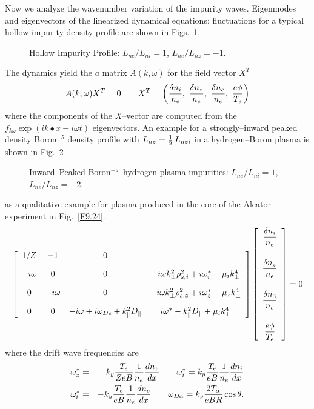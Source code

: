 \documentclass[a4paper,openany,12pt]{book}
\begin{document}
Now we analyze the wavenumber variation of the impurity waves. Eigenmodes and eigenvectors of the linearized dynamical equations:  fluctuations for a typical hollow impurity density profile are shown in Figs.~\ref{F9.29}.
%
\begin{figure}[H]
\centerline{}
\caption{Hollow Impurity Profile: $L_{ne}/L_{ni}= 1$, $L_{ne}/L_{nz}= -1$.}
\label{F9.29}
\end{figure}
%
The dynamics yield the $a$ matrix $A(k,\omega)$ for the field vector $X^T$
$$A(k,\omega)X^T=0\qquad X^T=\left({\delta n_i\over n_e},\ {\delta n_z\over n_e},\ {\delta n_e\over n_e},\ {e\phi\over T_e}\right)$$
where the components of the $X$--vector are computed from the $f_{k\omega}\exp(ik\bullet x-i\omega t)$ eigenvectors. An example for a strongly--inward peaked density Boron$^{+5}$ density profile with $L_{nz}={1\over 2}\, L_{nzi}$ in a hydrogen--Boron plasma is shown in Fig.~\ref{F9.30}
%
\begin{figure}[H]
\centerline{}
\centerline{}
\caption{Inward--Peaked Boron$^{+5}$--hydrogen plasma impurities: $L_{ne}/L_{ni}= 1$, $L_{ne}/L_{nz}= +2$.}
\label{F9.30}
\end{figure}
%
as a qualitative example for plasma produced in the core of the Alcator experiment in Fig.~\ref{F9.24}.
$$\left[\begin{array}{cccc}
1/Z &-1 &0\\[10pt]
-i\omega &0 &0 &-i\omega k^2_\perp\rho^2_{s,i}+i\omega^*_i-\mu_i k^4_\perp\\[10pt]
0 &-i\omega &0 &-i\omega k^2_\perp\rho^2_{s,z}+i\omega^*_z-\mu_z k^4_\perp\\[10pt]
0 &0 &-i\omega+i\omega_{De}+k^2_\|D_\| &i\omega^*-k^2_\| D_\|+\mu_i k^4_\perp
\end{array}\right]\left[\begin{array}{c}
\displaystyle{\delta n_i\over n_e}\\[20pt]
\displaystyle{\delta n_z\over n_e}\\[20pt]
\displaystyle{\delta n_3\over n_e}\\[20pt]
\displaystyle{e\phi\over T_e}\end{array}\right]=0$$
where the drift wave frequencies are
\begin{eqnarray*}
\omega^*_z&=&k_y{T_e\over ZeB}{1\over n_e}{dn_z\over dx}\qquad\omega^*_i=k_y{T_e\over eB}{1\over n_e}
{dn_i\over dx}\\
\omega^*_i&=&-k_y{T_e\over eB}{1\over n_e}{dn_e\over dx}\qquad\omega_{D\alpha}=k_y{2T_\alpha\over eBR}\cos\theta.
\end{eqnarray*}
\end{document}
